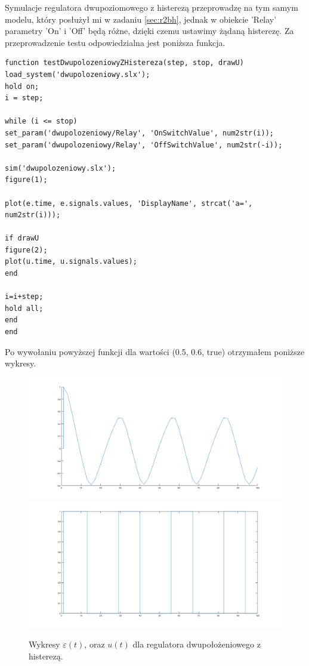 \documentclass[a4paper,10pt]{article}
\begin{document}
Symulacje regulatora dwupoziomowego z histerezą przeprowadzę na tym samym modelu, który posłużył mi w zadaniu \ref{sec:r2bh}, jednak w obiekcie 'Relay' parametry 'On' i 'Off' będą różne, dzięki czemu ustawimy żądaną histerezę.\newpage
Za przeprowadzenie testu odpowiedzialna jest poniższa funkcja.

\begin{lstlisting}[caption=Funkcja testująca regulator dwupołożeniowy z histerezą.]
function testDwupolozeniowyZHistereza(step, stop, drawU)
load_system('dwupolozeniowy.slx');
hold on;
i = step;

while (i <= stop)
set_param('dwupolozeniowy/Relay', 'OnSwitchValue', num2str(i));
set_param('dwupolozeniowy/Relay', 'OffSwitchValue', num2str(-i));

sim('dwupolozeniowy.slx');
figure(1);

plot(e.time, e.signals.values, 'DisplayName', strcat('a=', num2str(i)));

if drawU
figure(2);
plot(u.time, u.signals.values);
end

i=i+step;
hold all;
end
end
\end{lstlisting}

Po wywołaniu powyższej funkcji dla wartości (0.5, 0.6, true) otrzymałem poniższe wykresy.

\begin{figure}[!h]
    \centering
	\includegraphics[width=120mm]{dwu_z_his_e.png}
	\includegraphics[width=120mm]{dwu_z_his_u.png}
	\caption{Wykresy $\varepsilon(t)$, oraz $u(t)$ dla regulatora dwupołożeniowego z histerezą.}
    \label{fig:Rysunek}
\end{figure}
\end{document}
